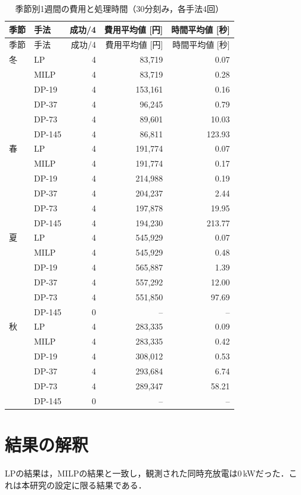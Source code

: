 \documentclass[a4paper,11pt,xelatex,ja=standard]{bxjsarticle}
\begin{document}
\begingroup
\small
\setlength{\tabcolsep}{3pt}
\begin{longtable}{llrrr}
    \caption{季節別1週間の費用と処理時間（30分刻み，各手法4回）}\label{tab:season} \\
    \toprule
    季節 & 手法     & 成功/4 & 費用平均値 [円] & 時間平均値 [秒]              \\
    \midrule
    \endfirsthead
    \toprule
    季節 & 手法     & 成功/4 & 費用平均値 [円] & 時間平均値 [秒]              \\
    \midrule
    \endhead
    冬  & LP     & 4    & 83,719    & 0.07                   \\
       & MILP   & 4    & 83,719    & 0.28                   \\
       & DP-19  & 4    & 153,161   & 0.16                   \\
       & DP-37  & 4    & 96,245    & 0.79                   \\
       & DP-73  & 4    & 89,601    & 10.03                  \\
       & DP-145 & 4    & 86,811    & 123.93                 \\
    \midrule
    春  & LP     & 4    & 191,774   & 0.07                   \\
       & MILP   & 4    & 191,774   & 0.17                   \\
       & DP-19  & 4    & 214,988   & 0.19                   \\
       & DP-37  & 4    & 204,237   & 2.44                   \\
       & DP-73  & 4    & 197,878   & 19.95                  \\
       & DP-145 & 4    & 194,230   & 213.77                 \\
    \midrule
    夏  & LP     & 4    & 545,929   & 0.07                   \\
       & MILP   & 4    & 545,929   & 0.48                   \\
       & DP-19  & 4    & 565,887   & 1.39                   \\
       & DP-37  & 4    & 557,292   & 12.00                  \\
       & DP-73  & 4    & 551,850   & 97.69                  \\
       & DP-145 & 0    & --        & --                     \\
    \midrule
    秋  & LP     & 4    & 283,335   & 0.09                   \\
       & MILP   & 4    & 283,335   & 0.42                   \\
       & DP-19  & 4    & 308,012   & 0.53                   \\
       & DP-37  & 4    & 293,684   & 6.74                   \\
       & DP-73  & 4    & 289,347   & 58.21                  \\
       & DP-145 & 0    & --        & --                     \\
    \bottomrule
\end{longtable}
\endgroup

\section{結果の解釈}
LPの結果は，MILPの結果と一致し，観測された同時充放電は0\,kWだった．これは本研究の設定に限る結果である．
\end{document}
